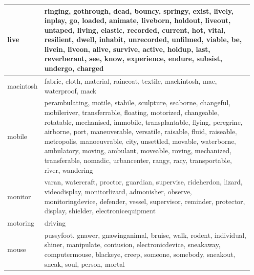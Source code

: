 \documentclass[12pt,a4paper]{report}
\begin{document}
\begin{table}[H]
\begin{center}
\begin{tabular}{ |l|p{14cm}|}
live & ringing, gothrough, dead, bouncy, springy, exist, lively, inplay, go, loaded, animate, liveborn, holdout, liveout, untaped, living, elastic, recorded, current, hot, vital, resilient, dwell, inhabit, unrecorded, unfilmed, viable, be, livein, liveon, alive, survive, active, holdup, last, reverberant, see, know, experience, endure, subsist, undergo, charged\\
\hline
macintosh & fabric, cloth, material, raincoat, textile, mackintosh, mac, waterproof, mack\\
\hline
mobile & perambulating, motile, stabile, sculpture, seaborne, changeful, mobileriver, transferrable, floating, motorized, changeable, rotatable, mechanised, immobile, transplantable, flying, peregrine, airborne, port, maneuverable, versatile, raisable, fluid, raiseable, metropolis, manoeuvrable, city, unsettled, movable, waterborne, ambulatory, moving, ambulant, moveable, roving, mechanized, transferable, nomadic, urbancenter, rangy, racy, transportable, river, wandering\\
\hline
monitor & varan, watercraft, proctor, guardian, supervise, rideherdon, lizard, videodisplay, monitorlizard, admonisher, observe, monitoringdevice, defender, vessel, supervisor, reminder, protector, display, shielder, electronicequipment\\
\hline
motoring & driving\\
\hline
mouse & pussyfoot, gnawer, gnawinganimal, bruise, walk, rodent, individual, shiner, manipulate, contusion, electronicdevice, sneakaway, computermouse, blackeye, creep, someone, somebody, sneakout, sneak, soul, person, mortal\\
\hline

\end{tabular}
\end{center}
\end{table}
\end{document}
